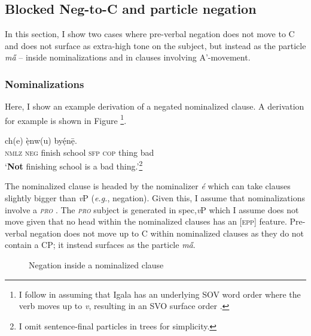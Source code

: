 \documentclass[output=paper,colorlinks,citecolor=brown,
]{langscibook}
\begin{document}
\subsection{Blocked Neg-to-C and particle negation}

In this section, I show two cases where pre-verbal negation does not move to C\xhead{} and does not surface as extra-high tone on the subject, but instead as the particle \textit{m\H{a}} -- inside nominalizations and in clauses involving A'-movement.

\subsubsection{Nominalizations}

Here, I show an example derivation of a negated nominalized clause. A derivation for example  is shown in Figure \footnote{I follow \citet{Tremblay2022} in assuming that Igala has an underlying SOV word order where the verb moves up to \textit{v}, resulting in an SVO surface order \citep{koopman1984syntax}.}.

\ea \label{ex:chaperon:nomz}
\gll [\'{e} \circled{m\H{a}}  kp\={a} \`{i}sk\'{u}l\`{u} \'{n}] ch(e) \`{ẹ}nw(u) by\'{ẹ}n\={ẹ}.\\
    \textsc{nmlz} \textsc{neg} finish school  \textsc{sfp} \textsc{cop} thing bad\\
    \glt `\textbf{Not} finishing school is a bad thing.'\footnote{I omit sentence-final particles in trees for simplicity.}
\z

The nominalized clause is headed by the nominalizer \textit{\'{e}} which can take clauses slightly bigger than \textit{v}P (\textit{e.g.}, negation). Given this, I assume that nominalizations involve a \textit{\textsc{pro}} \citep[][among others]{abney1987english, kratzer1996severing}. The \textit{\textsc{pro}} subject is generated in spec,\textit{v}P which I assume does not move given that no head within the nominalized clauses has an [\textsc{epp}] feature. 
Pre-verbal negation does not move up to C\xhead{} within nominalized clauses as they do not contain a CP; it instead surfaces as the particle \textit{m\H{a}}.\\

\begin{figure} 
\caption{Negation inside a nominalized clause}
  \label{fig:chaperon:nomztree}
\end{figure}
\end{document}
